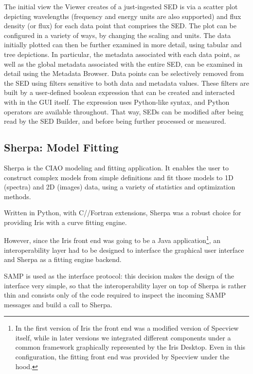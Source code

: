 \documentclass[final,5p]{elsarticle}
\begin{document}
The initial view the Viewer creates of a just-ingested SED is via a scatter plot depicting wavelengths (frequency and energy units are also supported) and flux density (or flux) for each data point that comprises the SED. The plot can be configured in a variety of ways, by changing the scaling and units. The data initially plotted can then be further examined in more detail, using tabular and tree depictions. In particular, the metadata associated with each data point, as well as the global metadata associated with the entire SED, can be examined in detail using the Metadata Browser. Data points can be selectively removed from the SED using filters sensitive to both data and metadata values. These filters are built by a user-defined boolean expression that can be created and interacted with in the GUI itself. The expression uses Python-like syntax, and Python operators are available throughout. That way, SEDs can be modified after being read by the SED Builder, and before being further processed or measured.

\subsection{Sherpa: Model Fitting}
\label{subsec:sherpa}
Sherpa is the CIAO modeling and fitting application. It enables the user to construct complex models from simple definitions and fit those models to 1D (spectra) and 2D (images) data, using a variety of statistics and optimization methods.

Written in Python, with C/\Cpp/Fortran extensions, Sherpa was a robust choice for providing Iris with a curve fitting engine.

However, since the Iris front end was going to be a Java application\footnote{In the first version of Iris the front end was a modified version of Specview itself, while in later versions we integrated different components under a common framework graphically represented by the Iris Desktop. Even in this configuration, the fitting front end was provided by Specview under the hood.}, an interoperability layer had to be designed to interface the graphical user interface and Sherpa as a fitting engine backend.

SAMP is used as the interface protocol: this decision makes the design of the interface very simple, so that the interoperability layer on top of Sherpa is rather thin and consists only of the code required to inspect the incoming SAMP messages and build a call to Sherpa.
\end{document}

